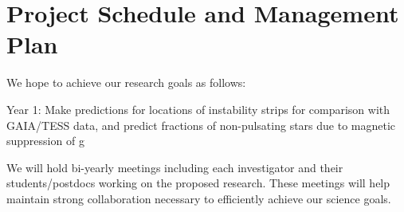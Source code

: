 \section{Project Schedule and Management Plan}

We hope to achieve our research goals as follows:

Year 1: Make predictions for locations of instability strips for comparison with GAIA/TESS data, and predict fractions of non-pulsating stars due to magnetic suppression of g 

We will  hold bi-yearly meetings including each investigator and their students/postdocs working on the proposed research. These meetings will help maintain strong collaboration necessary to efficiently achieve our science goals.
